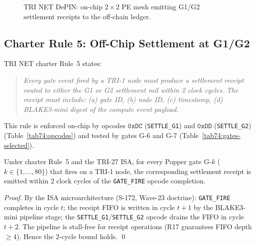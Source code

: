 \begin{figure}[H]
\centering
{}
\caption{TRI NET DePIN: on-chip $2{\times}2$ PE mesh emitting G1/G2
         settlement receipts to the off-chain ledger.}
\label{fig74:depin-arch}
\end{figure}

\subsection{Charter Rule 5: Off-Chip Settlement at G1/G2}
\label{sec74:charter-rule5}

TRI NET charter Rule~5 states:
\begin{quote}
\emph{Every gate event fired by a TRI-1 node must produce a settlement
receipt routed to either the G1 or G2 settlement rail within 2 clock
cycles.  The receipt must include: (a) gate ID, (b) node ID, (c)
timestamp, (d) BLAKE3-mini digest of the compute event payload.}
\end{quote}
This rule is enforced on-chip by opcodes $\mathtt{0xDC}$
(\texttt{SETTLE\_G1}) and $\mathtt{0xDD}$ (\texttt{SETTLE\_G2})
(Table~\ref{tab74:opcodes}) and tested by gates G-6 and G-7
(Table~\ref{tab74:gates-selected}).

\begin{theorem}
\label{thm74:settlement-latency}
Under charter Rule~5 and the TRI-27 ISA, for every Popper gate G-$k$
($k \in \{1,\ldots,80\}$) that fires on a TRI-1 node, the corresponding
settlement receipt is emitted within 2 clock cycles of the
\texttt{GATE\_FIRE} opcode completion.
\end{theorem}
\begin{proof}
By the ISA microarchitecture (S-172, Wave-23 doctrine):
\texttt{GATE\_FIRE} completes in cycle $t$; the receipt FIFO is written
in cycle $t+1$ by the BLAKE3-mini pipeline stage; the
\texttt{SETTLE\_G1}/\texttt{SETTLE\_G2} opcode drains the FIFO in cycle
$t+2$.  The pipeline is stall-free for receipt operations (R17 guarantees
FIFO depth $\geq 4$).  Hence the 2-cycle bound holds.
\qed
\end{proof}

